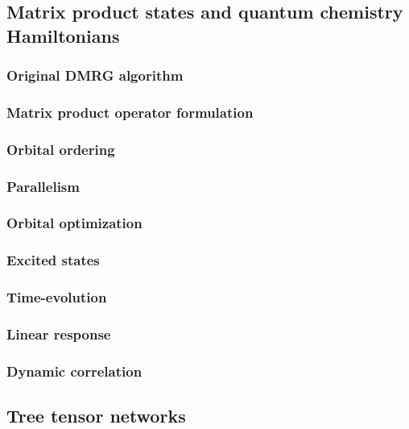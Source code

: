 \documentclass[letterpaper,12pt]{article}
\begin{document}
\subsection{Matrix product states and quantum chemistry Hamiltonians}

\subsubsection{Original DMRG algorithm}

\subsubsection{Matrix product operator formulation}

\subsubsection{Orbital ordering}

\subsubsection{Parallelism}

\subsubsection{Orbital optimization}

\subsubsection{Excited states}

\subsubsection{Time-evolution}

\subsubsection{Linear response}

\subsubsection{Dynamic correlation}

\subsection{Tree tensor networks}
\end{document}

